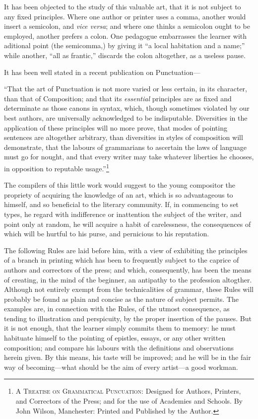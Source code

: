 It has been objected to the study of this valuable art, that it is not subject
to any fixed principles. Where one author or printer uses a comma, another would
insert a semicolon, and \emph{vice versa}; and where one thinks a semicolon
ought to be employed, another prefers a colon. One pedagogue embarrasses the
learner with aditional point (the semicomma,) by giving it ``a local habitation
and a name;'' while another, ``all as frantic,'' discards the colon altogether,
as a useless pause.

It has been well stated in a recent publication on Punct\-uation---

\begin{example}
    ``That the art of Punctuation is not more varied or less certain, in its
    character, than that of Composition; and that its \emph{essential}
    principles are as fixed and determinate as those canons in syntax, which,
    though sometimes violated by our best authors, are universally acknowledged
    to be indisputable. Diversities in the application of these principles will
    no more prove, that modes of pointing sentences are altogether arbitrary,
    than diversities in styles of composition will demonstrate, that the labours
    of grammarians to ascertain the laws of language must go for nought, and
    that every writer may take whatever liberties he chooses, in opposition to
    reputable usage.''\footnote{\textsc{A Treatise on Grammatical Puncuation}:
    Designed for Authors, Printers, and Correctors of the Press; and for the use
    of Academies and Schools. By John Wilson, Manchester: Printed and Published
    by the Author.}
\end{example}

The compilers of this little work would suggest to the young compositor
the propriety of acquiring the knowledge of an art, which is so advantageous to
himself, and so beneficial to the literary community. If, in commencing to set
types, he regard with indifference or inattention the subject of the writer, and
point only at random, he will acquire a habit of carelessness, the consequences
of which will be hurtful to his purse, and pernicious to his reputation.

The following Rules are laid before him, with a view of exhibiting the
principles of a branch in printing which has been to frequently subject to the
caprice of authors and correctors of the press; and which, consequently, has
been the means of creating, in the mind of the beginner, an antipathy to the
profession altogther. Although not entirely exempt from the technicalities of
grammar, these Rules will probably be found as plain and concise as the nature
of subject permits. The examples are, in connection with the Rules, of the
utmost consequence, as tending to illustration and perspicuity, by the proper
insertion of the pauses. But it is not enough, that the learner simply commits
them to memory: he must habituate himself to the pointing of epistles, essays,
or any other written composition; and compare his labours with the definitions
and observations herein given. By this means, his taste will be improved; and he
will be in the fair way of becoming---what should be the aim of every artist---a
good workman.

